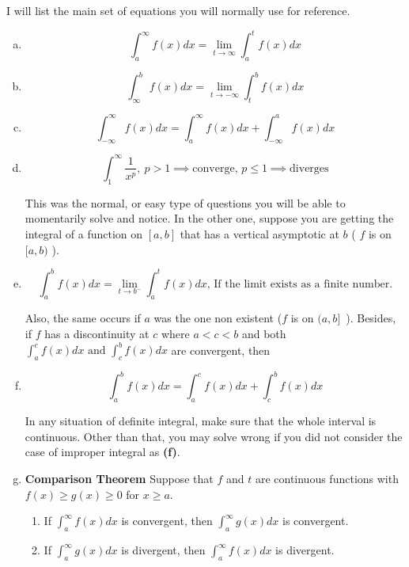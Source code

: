 \documentclass{article}
\begin{document}
	I will list the main set of equations you will normally use for reference.

	\begin{enumerate}[a.]
		\item $$\int^{\infty}_{a} f(x) dx = \lim_{t \to \infty} \int^{t}_{a} f(x) dx   $$
		\item $$\int^{b}_{\infty} f(x) dx = \lim_{t \to -\infty} \int^{b}_{t} f(x) dx  $$
		\item 
			$$ \int^{\infty}_{-\infty} f(x) dx =
			\int^{\infty}_{a} f(x) dx + \int^{a}_{-\infty} f(x) dx 
			$$
		\item $$ \int^{\infty}_{1} \frac{1}{x^p} ,\ p>1 \implies \text{converge, } p 	\leq 1 \implies \text{diverges} $$


			This was the normal, or easy type of questions you will be able to momentarily solve and notice. In the other one, suppose you are getting the integral of a function on $ [a,b] $ that has a vertical asymptotic at $ b $ ( $ f $ is on $[a,b)$ ). 

		\item $$ \int^{b}_{a} f(x) dx = \lim_{t 	\to b^-	} \int^{t}_{a} f(x) dx \text{,  If the limit exists as a finite number.}  $$

			Also, the same occurs if $ a $ was the one non existent ($f$ is on $ (a,b]$\ ). Besides, if $ f $ has a discontinuity at $ c $ where $ a<c<b $ and both $ \int^{c}_{a} f(x) dx \text{ and } \int^{b}_{c} f(x) dx   $ are convergent, then 
		\item \[
				\int^{b}_{a} f(x) dx =
				\int^{c}_{a} f(x) dx + \int^{b}_{c} f(x) dx 
			\]

			In any situation of definite integral, make sure that the whole interval is continuous. Other than that, you may solve wrong if you did not consider the case of improper integral as \textbf{(f)}.

		\item \textbf{Comparison Theorem}  
			Suppose that $f$ and $t$ are continuous functions with $f(x) 	\geq g(x) 	\geq  0$ for $x \geq  a$.
			\begin{enumerate}[1.]
				\item If $\int^{\infty}_{a} f(x) dx$  is convergent, then $ \int^{\infty}_{a} g(x) dx   $  is convergent.
				\item
					If $\int^{\infty}_{a} g(x) dx$  is divergent, then $ \int^{\infty}_{a} f(x) dx   $  is divergent.
			\end{enumerate}
	\end{enumerate}
\end{document}
